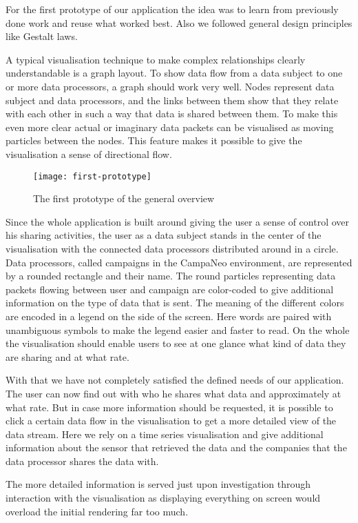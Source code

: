 
For the first prototype of our application the idea was to learn from previously done work and reuse what worked best. Also we followed general design principles like Gestalt laws.

A typical visualisation technique to make complex relationships clearly understandable is a graph layout. To show data flow from a data subject to one or more data processors, a graph should work very well. 
Nodes represent data subject and data processors, and the links between them show that they relate with each other in such a way that data is shared between them. 
To make this even more clear actual or imaginary data packets can be visualised as moving particles between the nodes. 
This feature makes it possible to give the visualisation a sense of directional flow.
\begin{figure}
    \centering
    \texttt{[image: first-prototype]}    \caption{The first prototype of the general overview}
    \label{fig:my_label}
\end{figure}

Since the whole application is built around giving the user a sense of control over his sharing activities, the user as a data subject stands in the center of the visualisation with the connected data processors  distributed around in a circle.
Data processors, called campaigns in the CampaNeo environment, are represented by a rounded rectangle and their name. The round particles representing data packets flowing between user and campaign are color-coded to give additional information on the type of data that is sent. 
The meaning of the different colors are encoded in a legend on the side of the screen. Here words are paired with unambiguous symbols to make the legend easier and faster to read.
On the whole the visualisation should enable users to see at one glance what kind of data they are sharing and at what rate.

With that we have not completely satisfied the defined needs of our application. The user can now find out with who he shares what data and approximately at what rate. But in case more information should be requested, it is possible to click a certain data flow in the visualisation to get a more detailed view of the data stream. Here we rely on a time series visualisation and give additional information about the sensor that retrieved the data and the companies that the data processor shares the data with.

The more detailed information is served just upon investigation through interaction with the visualisation as displaying everything on screen would overload the initial rendering far too much.

